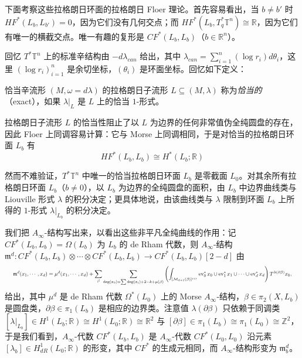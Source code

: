 
下面考察这些拉格朗日环面的拉格朗日 Floer 理论。首先容易看出，当 $b\neq b'$ 时 $HF^{\ast} (L_b, L_{b'})=0$，因为它们没有几何交点；而 $HF^{\ast} (L_b,T^{\ast}_q\mathbb{T}^n)\cong\mathbb{R}$，因为它们有唯一的横截交点。唯一有趣的复形是 $CF^{\ast} (L_b,L_b)$（$b\in\mathbb{R}^n$）。

回忆 $T^{\ast}\mathbb{T}^n$ 上的标准辛结构由 $-d\lambda_{can}$ 给出，其中 $\lambda_{can}=\sum_{i=1}^n (\log r_i)d\theta_i$，这里 $(\log r_i)_{i=1}^n$ 是余切坐标，$(\theta_i)$ 是环面坐标。回忆如下定义：

\begin{definition*}
恰当辛流形 $(M,\omega=d\lambda)$ 的拉格朗日子流形 $L\subseteq (M,\lambda)$ 称为\emph{恰当的}（exact），如果 $\lambda\vert_L$ 是 $L$ 上的恰当 $1$-形式。
\end{definition*}

拉格朗日子流形 $L$ 的恰当性阻止了以 $L$ 为边界的任何非常值伪全纯圆盘的存在，因此 Floer 上同调容易计算：它与 Morse 上同调相同，于是对恰当的拉格朗日环面 $L_b$ 有
\[
  HF^{\ast} (L_b,L_b)\cong H^{\ast} (L_b;\mathbb{R})
\]

然而不难验证，$T^{\ast}\mathbb{T}^n$ 中唯一的恰当拉格朗日环面 $L_b$ 是零截面 $L_0$。对其余所有拉格朗日环面 $L_b$（$b\neq 0$），以 $L_b$ 为边界的全纯圆盘的面积，由 $L_b$ 中边界曲线类与 Liouville 形式 $\lambda$ 的积分决定；更具体地说，由该曲线类与 $\lambda$ 限制到环面 $L_b$ 上所得的 $1$-形式 $\lambda\vert_{L_b}$ 的积分决定。

我们把 $A_{\infty}$-结构写出来，以看出这些非平凡全纯曲线的作用：记 $CF^{\ast} (L_b,L_b)=\Omega(L_b)$ 为 $L_b$ 的 de Rham 代数，则 $A_{\infty}$-结构 $\mathfrak{m}^d\colon CF^{\ast} (L_b,L_b)\otimes\dotsb\otimes CF^{\ast} (L_b, L_b)\to CF^{\ast} (L_b,L_b)[2-d]$ 由
\[
  \resizebox{0.985\textwidth}{!}{$\displaystyle \mathfrak{m}^d (x_1,\dotsb, x_d)=\mu^d (x_1,\dotsb, x_d)+\sum_{\beta}\sum_{\deg (x_0)=\sum\deg (x_i)+2-k+\mu(\beta)}\left(\int_{[\mathcal{M}_{d+1} (\beta)]^{vir}}\ev_0^{\ast} x_0\cup\ev_1^{\ast} x_1\cup\dotsb\cup\ev_d^{\ast} x_d\right)T^{\lambda (\partial\beta)} x_0, $}
\]
给出，其中 $\mu^d$ 是 de Rham 代数 $\Omega^{\ast} (L_0)$ 上的 Morse $A_{\infty}$-结构，$\beta\in\pi_2 (X,L_b)$ 是圆盘类，$\partial\beta\in\pi_1 (L_b)$ 是相应的边界类。注意值 $\lambda(\partial\beta)$ 只依赖于同调类 $\left[\lambda\vert_{L_b}\right]\in H^1 (L_b;\mathbb{R})\cong H^1 (L_0;\mathbb{R})\cong\mathbb{R}^2$ 与 $[\partial\beta]\in\pi_1 (L_b)\cong\pi_1 (L_0)\cong\mathbb{Z}^2$，于是我们看到，$A_{\infty}$-代数 $CF^{\ast} (L_b,L_b)$ 是 $A_{\infty}$-代数 $CF^{\ast} (L_0,L_0)$ 沿元素 $[\lambda_b]\in H^1_{dR} (L_0;\mathbb{R})$ 的形变，其中 $CF^{\ast}$ 的生成元相同，而 $A_{\infty}$-结构形变为 $\mathfrak{m}^d_b$。

